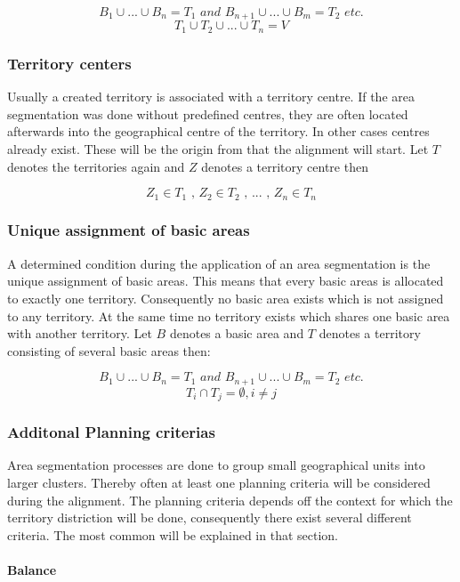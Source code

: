 \[ \mathit{B_{1} \cup  ... \cup B_{n}=T_{1} \text{ and } B_{n+1} \cup ... \cup B_{m}=T_{2} \text{ etc.}}\]
\[ \mathit{T_{1} \cup  T_{2} \cup ... \cup T_{n}=V}\]

\subsubsection{Territory centers}
Usually a created territory is associated with a territory centre. If the area segmentation was done without predefined centres, they are often located afterwards into the geographical centre of the territory. In other cases centres already exist. These will be the origin from that the alignment will start. Let $ T $ denotes the territories again and $ Z $ denotes a territory centre then

\[ \mathit{Z_{1} \in T_{1} \text{ , } Z_{2} \in T_{2} \text{ , } ... \text{ , } Z_{n} \in T_{n}}\]

\subsubsection{Unique assignment of basic areas}
A determined condition during the application of an area segmentation is the unique assignment of basic areas. This means that every basic areas is allocated to exactly one territory. Consequently no basic area exists which is not assigned to any territory. At the same time no territory exists which shares one basic area with another territory. Let $ B $ denotes a basic area and $ T $ denotes a territory consisting of several basic areas then:

\[ \mathit{B_{1} \cup  ... \cup B_{n}=T_{1} \text{ and } B_{n+1} \cup ... \cup B_{m}=T_{2} \text{ etc.} }\]
\[ \mathit{ T_{i} \cap T_{j}  =\emptyset, i \neq j}\]


\subsubsection{Additonal Planning criterias}\label{criterias}
Area segmentation processes are done to group small geographical units into larger clusters. Thereby often at least one planning criteria will be considered during the alignment. The planning criteria depends off the context for which the territory distriction will be done, consequently there exist several different criteria. The most common will be explained in that section.

\paragraph{Balance}\mbox{} \\

